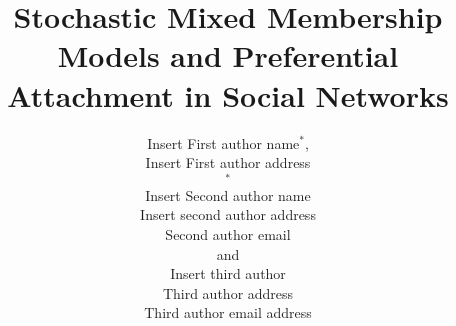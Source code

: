 \documentclass[numbib]{imaiai}
\newcommand{\blind}{0}
\begin{document}



%

\title{Stochastic Mixed Membership Models and Preferential Attachment in Social Networks}

\author{{%
\sc Insert First author name}$^*$,\\[2pt]
Insert First author address\\
$^*${}\\[2pt]
{\sc Insert Second author name}\\[2pt]
Insert second author address\\
{Second author email}\\[6pt]
{\sc and}\\[6pt]
{\sc Insert third author} \\[2pt]
Third author address\\
{Third author email address}}
\end{document}
